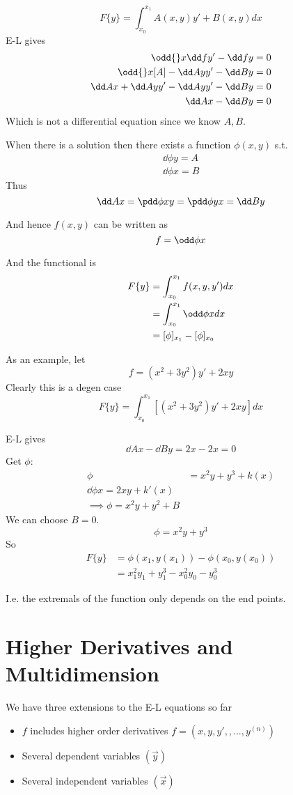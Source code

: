 \documentclass{X:/Documents/Coding/Latex/myassignment}
\begin{document}
\[F \{y\} = \int_{x_0}^{x_1} A(x,y) y' + B(x,y) dx\]
E-L gives
\begin{align*}
	\odd{}x \dd f{y'} - \dd fy = 0\\
	\odd{}x [A] - \dd Ay y'- \dd By =0\\
	\dd Ax + \dd Ay y' - \dd Ay y' - \dd By = 0\\
	\dd Ax - \dd By = 0
\end{align*}
Which is not a differential equation since we know $A, B$.


When there is a solution then there exists a function $\phi(x,y)$ s.t.
\begin{align*}
	\dd\phi y = A\\
	\dd\phi x = B
\end{align*}
Thus
\[\dd Ax = \pdd \phi xy = \pdd \phi yx = \dd By\]

And hence $f(x,y)$ can be written as
\[f = \odd \phi x\]

And the functional is
\begin{align*}
	F\{y\} &= \int_{x_0}^{x_1} f(x,y,y') dx\\
	&= \int_{x_0}^{x_1} \odd \phi x dx\\
	&= [\phi]_{x_1} - [\phi]_{x_0}
\end{align*}


As an example, let 
\[f = (x^2 + 3y^2)y' + 2xy\]
Clearly this is a degen case
\[F\{y\} = \int_{x_0}^{x_1} \left[(x^2 + 3y^2)y' + 2xy\right] dx\]

E-L gives
\[\dd Ax - \dd By = 2x - 2x = 0\]
Get $\phi$:
\begin{align*}
	\phi &= x^2y + y^3 + k(x)\\
	\dd \phi x = 2xy + k'(x)\\
	\implies \phi = x^2y + y^2 + B
\end{align*}
We can choose $B=0$.
\[\phi = x^2y + y^3\]
So
\begin{align*}
	F\{y\} &= \phi(x_1,y(x_1)) - \phi(x_0,y(x_0))\\
	&=	x_1^2 y_1 + y_1^3 - x_0^2 y_0 - y_0^3
\end{align*}


I.e. the extremals of the function only depends on the end points.

\section{Higher Derivatives and Multidimension}
We have three extensions to the E-L equations so far
\begin{itemize}
	\item $f$ includes higher order derivatives $f = (x,y,y',,\ldots,y^{(n)})$
	\item Several dependent variables $(\vec y)$
	\item Several independent variables $(\vec x)$
\end{itemize}
\end{document}
